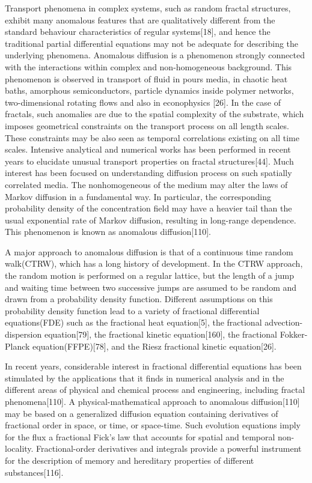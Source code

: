 {Transport phenomena in complex systems, such as random fractal structures, exhibit many anomalous features that are qualitatively different from the standard behaviour characteristics of regular systems[18], and hence the traditional partial differential equations may not be adequate for describing the underlying phenomena. Anomalous diffusion is a phenomenon strongly connected with the interactions within complex and non-homogeneous
background. This phenomenon is observed in transport of fluid in pours media, in chaotic heat baths, amorphous semiconductors, particle dynamics inside polymer networks, two-dimensional rotating flows and also in econophysics [26]. In the case of fractals, such anomalies are due to the spatial complexity of the substrate, which imposes geometrical constraints on the transport process on all length scales. These constraints may be also seen as temporal
correlations existing on all time scales. Intensive analytical and numerical works has been performed in recent years to elucidate unusual transport  properties on fractal structures[44]. Much interest has been focused on understanding diffusion process on such spatially correlated media. The nonhomogeneous of the medium may alter the laws of Markov diffusion in a fundamental way. In particular, the corresponding probability density of the concentration field may have a heavier tail than the usual exponential rate of Markov diffusion, resulting in long-range dependence. This phenomenon is known as anomalous diffusion[110].\

A major approach to anomalous diffusion is that of a continuous time random walk(CTRW),
which has a long history of development. In the CTRW approach, the random motion is performed on a regular lattice, but the length of a jump and waiting time between two successive jumps are assumed to be random and drawn from a probability density function. Different assumptions on this probability density function lead to a variety of fractional differential equations(FDE) such as the fractional heat equation[5], the fractional advection-dispersion equation[79], the fractional kinetic equation[160], the fractional Fokker-Planck equation(FFPE)[78], and the Riesz fractional kinetic equation[26].\

In recent years, considerable interest in fractional differential equations has been stimulated by the applications that it finds in numerical analysis and in the different areas of physical and chemical process and engineering, including fractal phenomena[110]. A physical-mathematical approach to anomalous diffusion[110] may be based on a generalized diffusion equation containing derivatives of fractional order in space, or time, or space-time. Such evolution equations imply for the flux a fractional Fick's law that accounts for spatial and temporal non-locality. Fractional-order derivatives and integrals provide a powerful instrument for the description of memory and hereditary properties of different substances[116].\

}

